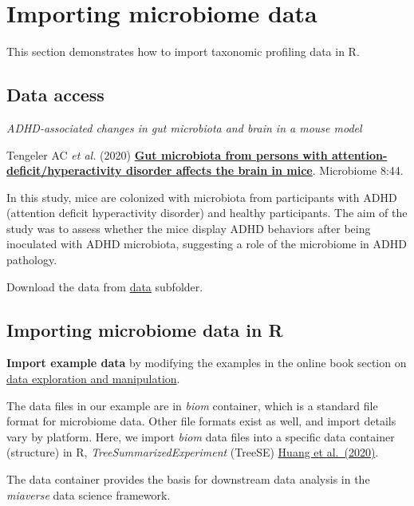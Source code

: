 \documentclass[
  oneside]{book}
\begin{document}
\hypertarget{importing-microbiome-data}{%
\chapter{Importing microbiome data}\label{importing-microbiome-data}}

This section demonstrates how to import taxonomic profiling data in R.

\hypertarget{data-access}{%
\section{Data access}\label{data-access}}

\emph{ADHD-associated changes in gut microbiota and brain in a mouse model}

Tengeler AC \emph{et
al.} (2020) \href{https://doi.org/10.1186/s40168-020-00816-x}{\textbf{Gut microbiota from persons with
attention-deficit/hyperactivity disorder affects the brain in
mice}}. Microbiome
8:44.

In this study, mice are colonized with microbiota from participants
with ADHD (attention deficit hyperactivity disorder) and healthy
participants. The aim of the study was to assess whether the mice
display ADHD behaviors after being inoculated with ADHD microbiota,
suggesting a role of the microbiome in ADHD pathology.

Download the data from
\href{https://github.com/microbiome/course_2022_radboud/tree/main/data}{data}
subfolder.

\hypertarget{importing-microbiome-data-in-r}{%
\section{Importing microbiome data in R}\label{importing-microbiome-data-in-r}}

\textbf{Import example data} by modifying the examples in the online book
section on \href{https://microbiome.github.io/OMA/data-introduction.html\#loading-experimental-microbiome-data}{data exploration and
manipulation}.

The data files in our example are in \emph{biom} container, which is a
standard file format for microbiome data. Other file formats exist as
well, and import details vary by platform. Here, we import \emph{biom} data
files into a specific data container (structure) in R,
\emph{TreeSummarizedExperiment} (TreeSE) \href{https://f1000research.com/articles/9-1246}{Huang et
al.~(2020)}.

The data container provides the basis for downstream data analysis in
the \emph{miaverse} data science framework.
\end{document}
